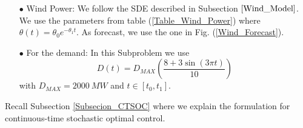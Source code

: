 \begin{enumerate}

\item[$\bullet$] Wind Power: We follow the SDE described in Subsection $\ref{Wind_Model}$. We use the parameters from table (\ref{Table_Wind_Power}) where $\theta(t)=\theta_0e^{-\theta_1t}$. As forecast, we use the one in Fig. (\ref{Wind_Forecast}).

\item[$\bullet$] For the demand: In this Subproblem we use
\begin{equation}
D(t)=D_{MAX}\left(\frac{8+3\sin(3\pi t)}{10}\right)
\label{Demand_3SP}
\end{equation}
with $D_{MAX}=\SI{2000}{MW}$ and $t\in[t_0,t_1]$.

\end{enumerate}

Recall Subsection \ref{Subsecion_CTSOC} where we explain the formulation for continuous-time stochastic optimal control.\\


